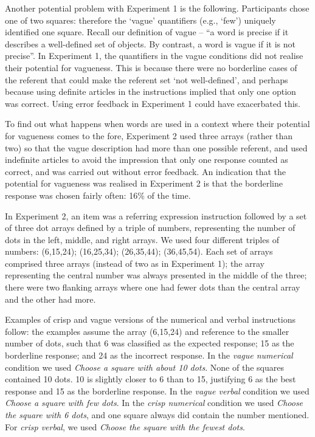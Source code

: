 \documentclass[%
man,		%
floatsintext,%
apacite%
]{apa6}
\begin{document}
Another potential problem with Experiment 1 is the following. Participants chose one of two squares: therefore the `vague' quantifiers (e.g., `few') uniquely identified one square. Recall our definition of vague  -- ``a word is precise if it describes a well-defined set of objects. By contrast, a word is vague if it is not precise''.  In Experiment 1, the quantifiers in the vague conditions did not realise their potential for vagueness. This is because there were no borderline cases of the referent that could make the referent set `not well-defined', and perhaps because using definite articles in the instructions implied that only one option was correct.
Using error feedback in Experiment 1 could have exacerbated this.

To find out what happens when words are used in a context where their potential for vagueness comes to the fore, Experiment 2 used three arrays (rather than two) so that the vague description had more than one possible referent, and used indefinite articles to avoid the impression that only one response counted as correct, and was carried out without error feedback.
An indication that the potential for vagueness was realised in Experiment 2 is that the borderline response was chosen fairly often: 16\% of the time.

In Experiment 2, an item was a referring expression instruction followed by a set of three dot arrays defined by a triple of numbers, representing the number of dots in the left, middle, and right arrays. We used four different triples of numbers: (6,15,24); (16,25,34); (26,35,44); (36,45,54). Each set of arrays comprised three arrays (instead of two as in Experiment 1); the array representing the central number was always presented in the middle of the three; there were two flanking arrays where one had fewer dots than the central array and the other had more.

Examples of crisp and vague versions of the numerical and verbal instructions follow: the examples assume the array (6,15,24) and reference to the smaller number of dots, such that 6 was classified as the expected response; 15 as the borderline response; and 24 as the incorrect response. In the {\em vague numerical} condition we used \emph{Choose a square with about 10 dots}. None of the squares contained 10 dots. 10 is slightly closer to 6 than to 15, justifying 6 as the best response and 15 as the borderline response. In the {\em vague verbal} condition we used \emph{Choose a square with few dots}. In the {\em crisp numerical} condition we used \emph{Choose the square with 6 dots}, and one square always did contain the number mentioned. For {\em crisp verbal}, we used \emph{Choose the square with the fewest dots}.
\end{document}
